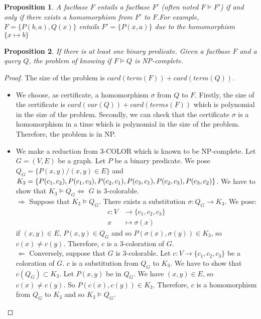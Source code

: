 \documentclass{article}
\newtheorem{proposition}{Proposition}[section]
\theoremstyle{definition}
\theoremstyle{remark}
\begin{document}
\begin{proposition}
A factbase $F$ \emph{entails} a factbase $F'$ (often noted $F \models F'$) if and only if there exists a homomorphism from $F'$ to $F$.For example, $F = \{P(b,a),Q(x)\}$ entails $F' = \{P(x,a)\}$ due to the homomorphism $\{x \mapsto b\}$ 
\end{proposition}

\begin{proposition} If there is at least one binary predicate. Given a factbase $F$ and a query $Q$, the problem of knowing if $F \models Q$ is NP-complete.
\end{proposition}

\begin{proof} The size of the problem is $card(term(F))+card(term(Q))$.
\begin{itemize}
\item We choose, as certificate, a homomorphism $\sigma$ from $Q$ to $F$. Firstly, the size of the certificate is $card(var(Q))+ card(terms(F))$ which is polynomial in the size of the problem. Secondly, we can check that the certificate $\sigma$ is a homomorphism in a time which is polynomial in the size of the problem. Therefore, the problem is in NP.  
\item We make a reduction from 3-COLOR which is known to be NP-complete. Let $G= (V,E)$ be a graph. Let $P$ be a binary predicate. We pose $Q_G = \{P(x,y)/(x,y) \in E\}$ and $K_3 = \{P(c_1,c_2),P(c_1,c_3), P(c_2,c_1),P(c_3,c_1),\\P(c_2,c_3),P(c_3,c_2)\}$. We have to show that $K_3 \models Q_G \Leftrightarrow$ $G$ is 3-colorable. \\
$\boxed{\Rightarrow}$ Suppose that $K_3 \models Q_G$. There exists a substitution $\sigma:Q_G \to K_3$. We pose: 
\begin{align*}
c:V &\to \{c_1,c_2,c_3\}\\
x &\mapsto \sigma(x)
\end{align*}
if $(x,y) \in E$, $P(x,y) \in Q_G$ and so $P(\sigma(x),\sigma(y)) \in K_3$, so $c(x) \neq c(y)$. Therefore, $c$ is a 3-coloration of $G$. \\
$\boxed{\Leftarrow}$ Conversely, suppose that $G$ is 3-colorable. Let $c:V \to \{c_1,c_2,c_3\}$ be a coloration of $G$. $c$ is a substitution from $Q_G$ to $K_3$. We have to show that $c(Q_G) \subset K_3$. Let $P(x,y)$ be in $Q_G$. We have $(x,y) \in E$, so $c(x) \neq c(y)$. So $P(c(x),c(y)) \in K_3$. Therefore, $c$ is a homomorphism from $Q_G$ to $K_3$ and so $K_3 \models Q_G$.
\end{itemize}
\end{proof}
\end{document}
